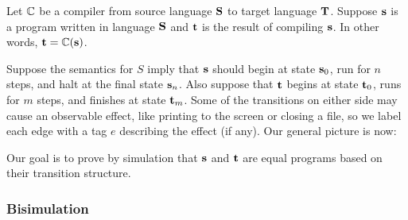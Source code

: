 Let $\mathbb{C}$ be a compiler from source language $\mathbf{S}$ to target language $\mathbf{T}$.
Suppose $\mathbf{s}$ is a program written in language $\mathbf{S}$ and $\mathbf{t}$ is the result of compiling $\mathbf{s}$.
In other words, $\mathbf{t} = \mathbb{C}(\mathbf{s})$.

Suppose the semantics for $S$ imply that $\mathbf{s}$ should begin at state $\mathbf{s}_0$, run for $n$ steps, and halt at the final state $\mathbf{s}_n$.
Also suppose that $\mathbf{t}$ begins at state $\mathbf{t}_0$, runs for $m$ steps, and finishes at state $\mathbf{t}_m$.
Some of the transitions on either side may cause an observable effect, like printing to the screen or closing a file, so we label each edge with a tag $e$ describing the effect (if any).
Our general picture is now:

\begin{center}
\end{center}

Our goal is to prove by simulation that $\mathbf{s}$ and $\mathbf{t}$ are equal programs based on their transition structure.


\subsubsection{Bisimulation}

